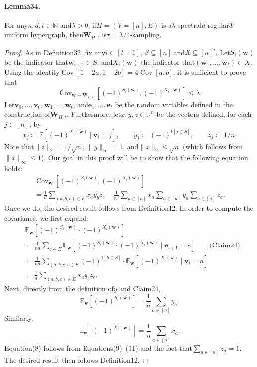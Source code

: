 \documentclass[10pt,a4paper]{article}
\DeclareMathOperator{\Cov}{Cov}
\begin{document}
\paragraph{Lemma34.} For any$n,d,t\in\mathbb N$ and$\lambda>0$, if$H=(V=[n],E)$ is a$\lambda$-spectral$d$-regular3-uniform hypergraph, then$\mathbf W_{H,t}$ is$\tau=\lambda/4$-sampling.
\begin{proof}
As in Definition32, fix any$i\in[t-1]$, $S\subseteq[n]$ and$X\subseteq[n]^i$. Let$S_i(\mathbf w)$ be the indicator that$\mathbf w_{i+1}\in S$, and$X_i(\mathbf w)$ the indicator that$(\mathbf w_1,\ldots,\mathbf w_t)\in X$. Using the identity$\Cov[1-2a,1-2b]=4\Cov[a,b]$, it is sufficient to prove that
\[\Cov_{\mathbf w\sim\mathbf W_{H,t}}[(-1)^{S_i(\mathbf w)},(-1)^{X_i(\mathbf w)}]\leq\lambda.\]
Let$\mathbf v_0,\ldots,\mathbf v_t$, $\mathbf w_1,\ldots,\mathbf w_t$, and$\mathbf e_1,\ldots,\mathbf e_t$ be the random variables defined in the construction of$\mathbf W_{H,t}$. Furthermore, let$x,y,z\in\mathbb R^n$ be the vectors defined, for each$j\in[n]$, by
\[x_j\coloneqq\mathbb E[(-1)^{X_i(\mathbf w)}\mid\mathbf v_i=j],\qquad y_j\coloneqq(-1)^{1[j\in S]},\qquad z_j\coloneqq1/n.\]
Note that$\|z\|_2=1/\sqrt n$, $\|y\|_{\infty}=1$, and$\|x\|_2\leq\sqrt n$ (which follows from$\|x\|_{\infty}\leq1$). Our goal in this proof will be to show that the following equation holds:
\begin{multline*}
\Cov_{\mathbf w}[(-1)^{S_i(\mathbf w)},(-1)^{X_i(\mathbf w)}]\\
=\frac1d\sum_{(a,b,c)\in E}x_ay_bz_c-\frac1{n^2}\sum_{a\in[n]}x_a\sum_{a\in[n]}y_a\sum_{a\in[n]}z_a.\tag{8}
\end{multline*}
Once we do, the desired result follows from Definition12. In order to compute the covariance, we first expand:
\begin{align*}
&\mathbb E_{\mathbf w}[(-1)^{S_i(\mathbf w)}\cdot(-1)^{X_i(\mathbf w)}]\\
&=\frac1{nd}\sum_{e\in E}\mathbb E_{\mathbf w}[(-1)^{S_i(\mathbf w)}\cdot(-1)^{X_i(\mathbf w)}\mid\mathbf e_{i+1}=e]\qquad\text{(Claim24)}\\
&=\frac1{nd}\sum_{(a,b,c)\in E}(-1)^{1[b\in S]}\cdot\mathbb E_{\mathbf w}[(-1)^{X_i(\mathbf w)}\mid\mathbf v_i=a]\\
&=\frac1d\sum_{(a,b,c)\in E}x_ay_bz_c.\tag{9}
\end{align*}
Next, directly from the definition of$y$ and Claim24,
\[\mathbb E_{\mathbf w}[(-1)^{S_i(\mathbf w)}]=\frac1n\sum_{a\in[n]}y_a.\tag{10}\]
Similarly,
\[\mathbb E_{\mathbf w}[(-1)^{X_i(\mathbf w)}]=\frac1n\sum_{a\in[n]}x_a.\tag{11}\]
Equation(8) follows from Equations(9)–(11) and the fact that$\sum_{a\in[n]}z_a=1$. The desired result then follows Definition12.
\end{proof}
\end{document}
